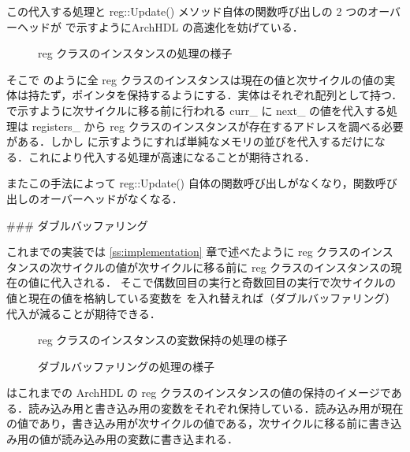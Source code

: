 この代入する処理と reg::Update() メソッド自体の関数呼び出しの
2 つのオーバーヘッドが で示すようにArchHDL の高速化を妨げている．

\begin{figure}[t]
 \begin{center}
  
 \end{center}
 \caption{ reg クラスのインスタンスの処理の様子}
 \label{fig:mem_copy}
\end{figure}


そこで のように全 reg クラスのインスタンスは現在の値と次サイクルの値の実体は持たず，ポインタを保持するようにする．実体はそれぞれ配列として持つ． で示すように次サイクルに移る前に行われる curr_ に next_ の値を代入する処理は registers_ から reg クラスのインスタンスが存在するアドレスを調べる必要がある．しかし  に示すようにすれば単純なメモリの並びを代入するだけになる．これにより代入する処理が高速になることが期待される．

またこの手法によって reg::Update() 自体の関数呼び出しがなくなり，関数呼び出しのオーバーヘッドがなくなる．


### ダブルバッファリング

これまでの実装では \ref{ss:implementation} 章で述べたように
reg クラスのインスタンスの次サイクルの値が次サイクルに移る前に reg クラスのインスタンスの現在の値に代入される．
そこで偶数回目の実行と奇数回目の実行で次サイクルの値と現在の値を格納している変数を
を入れ替えれば（ダブルバッファリング）代入が減ることが期待できる．

\begin{figure}[t]
 \begin{center}
  
 \end{center}
 \caption{reg クラスのインスタンスの変数保持の処理の様子}
 \label{fig:reg_curr_next}
\end{figure}

\begin{figure}[t]
 \begin{center}
  
 \end{center}
 \caption{ダブルバッファリングの処理の様子}
 \label{fig:double_buffer}
\end{figure}

 はこれまでの ArchHDL の reg クラスのインスタンスの値の保持のイメージである．読み込み用と書き込み用の変数をそれぞれ保持している．読み込み用が現在の値であり，書き込み用が次サイクルの値である，次サイクルに移る前に書き込み用の値が読み込み用の変数に書き込まれる．

